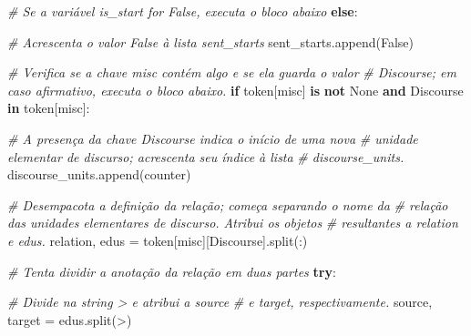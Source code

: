\documentclass[
  brazilian,
]{article}
\newenvironment{Shaded}{}{}
\newcommand{\CommentTok}[1]{\textcolor[rgb]{0.38,0.63,0.69}{\textit{#1}}}
\newcommand{\ControlFlowTok}[1]{\textcolor[rgb]{0.00,0.44,0.13}{\textbf{#1}}}
\newcommand{\KeywordTok}[1]{\textcolor[rgb]{0.00,0.44,0.13}{\textbf{#1}}}
\newcommand{\NormalTok}[1]{#1}
\newcommand{\OperatorTok}[1]{\textcolor[rgb]{0.40,0.40,0.40}{#1}}
\newcommand{\StringTok}[1]{\textcolor[rgb]{0.25,0.44,0.63}{#1}}
\newcommand{\VariableTok}[1]{\textcolor[rgb]{0.10,0.09,0.49}{#1}}
\begin{document}
\begin{Shaded}
\begin{Highlighting}[]
        \CommentTok{\# Se a variável \textquotesingle{}is\_start\textquotesingle{} for False, executa o bloco abaixo}
        \ControlFlowTok{else}\NormalTok{:}
            
            \CommentTok{\# Acrescenta o valor False à lista \textquotesingle{}sent\_starts\textquotesingle{}}
\NormalTok{            sent\_starts.append(}\VariableTok{False}\NormalTok{)}
        
        \CommentTok{\# Verifica se a chave \textquotesingle{}misc\textquotesingle{} contém algo e se ela guarda o valor}
        \CommentTok{\# \textquotesingle{}Discourse\textquotesingle{}; em caso afirmativo, executa o bloco abaixo.}
        \ControlFlowTok{if}\NormalTok{ token[}\StringTok{\textquotesingle{}misc\textquotesingle{}}\NormalTok{] }\KeywordTok{is} \KeywordTok{not} \VariableTok{None} \KeywordTok{and} \StringTok{\textquotesingle{}Discourse\textquotesingle{}} \KeywordTok{in}\NormalTok{ token[}\StringTok{\textquotesingle{}misc\textquotesingle{}}\NormalTok{]:}
            
            \CommentTok{\# A presença da chave \textquotesingle{}Discourse\textquotesingle{} indica o início de uma nova}
            \CommentTok{\# unidade elementar de discurso; acrescenta seu índice à lista}
            \CommentTok{\# \textquotesingle{}discourse\_units\textquotesingle{}.}
\NormalTok{            discourse\_units.append(counter)}
            
            \CommentTok{\# Desempacota a definição da relação; começa separando o nome da}
            \CommentTok{\# relação das unidades elementares de discurso. Atribui os objetos}
            \CommentTok{\# resultantes a \textquotesingle{}relation\textquotesingle{} e \textquotesingle{}edus\textquotesingle{}.}
\NormalTok{            relation, edus }\OperatorTok{=}\NormalTok{ token[}\StringTok{\textquotesingle{}misc\textquotesingle{}}\NormalTok{][}\StringTok{\textquotesingle{}Discourse\textquotesingle{}}\NormalTok{].split(}\StringTok{\textquotesingle{}:\textquotesingle{}}\NormalTok{)}
            
            \CommentTok{\# Tenta dividir a anotação da relação em duas partes}
            \ControlFlowTok{try}\NormalTok{:}
                
                \CommentTok{\# Divide na string \textquotesingle{}{-}\textgreater{}\textquotesingle{} e atribui a \textquotesingle{}source\textquotesingle{}}
                \CommentTok{\# e \textquotesingle{}target\textquotesingle{}, respectivamente.}
\NormalTok{                source, target }\OperatorTok{=}\NormalTok{ edus.split(}\StringTok{\textquotesingle{}{-}\textgreater{}\textquotesingle{}}\NormalTok{)}
                

\end{Highlighting}
\end{Shaded}
\end{document}
